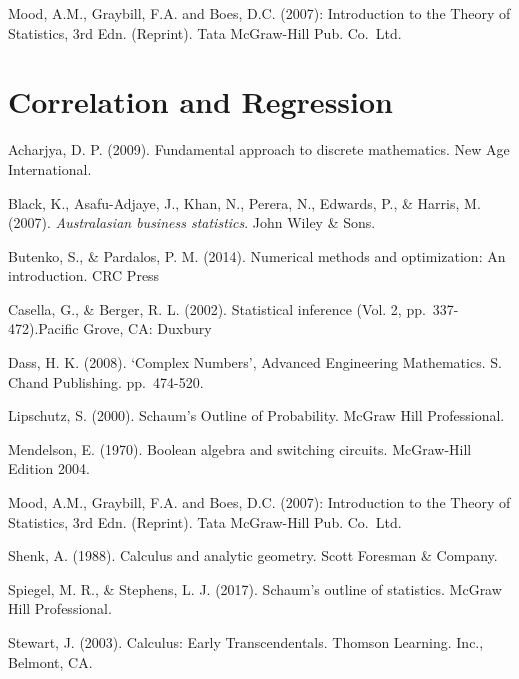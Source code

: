 \documentclass[]{book}
\begin{document}
Mood, A.M., Graybill, F.A. and Boes, D.C. (2007): Introduction to the Theory of Statistics, 3rd Edn. (Reprint). Tata McGraw-Hill Pub. Co.~Ltd.

\hypertarget{correlation-and-regression}{%
\chapter{Correlation and Regression}\label{correlation-and-regression}}

Acharjya, D. P. (2009). Fundamental approach to discrete mathematics. New Age International.

Black, K., Asafu-Adjaye, J., Khan, N., Perera, N., Edwards, P., \& Harris, M. (2007). \emph{Australasian business statistics}. John Wiley \& Sons.

Butenko, S., \& Pardalos, P. M. (2014). Numerical methods and optimization: An introduction. CRC Press

Casella, G., \& Berger, R. L. (2002). Statistical inference (Vol. 2, pp.~337-472).Pacific Grove, CA: Duxbury

Dass, H. K. (2008). `Complex Numbers', Advanced Engineering Mathematics. S. Chand Publishing. pp.~474-520.

Lipschutz, S. (2000). Schaum's Outline of Probability. McGraw Hill Professional.

Mendelson, E. (1970). Boolean algebra and switching circuits. McGraw-Hill Edition 2004.

Mood, A.M., Graybill, F.A. and Boes, D.C. (2007): Introduction to the Theory of Statistics, 3rd Edn. (Reprint). Tata McGraw-Hill Pub. Co.~Ltd.

Shenk, A. (1988). Calculus and analytic geometry. Scott Foresman \& Company.

Spiegel, M. R., \& Stephens, L. J. (2017). Schaum's outline of statistics. McGraw Hill Professional.

Stewart, J. (2003). Calculus: Early Transcendentals. Thomson Learning. Inc., Belmont, CA.


\end{document}
